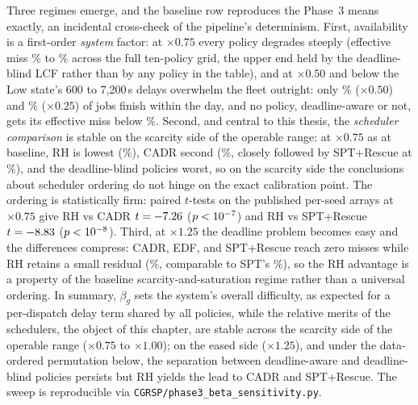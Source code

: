 {Three regimes emerge, and the baseline row reproduces the Phase~3 means exactly, an incidental cross-check of the pipeline's determinism. First, availability is a first-order \emph{system} factor: at $\times 0.75$ every policy degrades steeply (effective miss \BetaThreeQuarterMinEffMiss\% to \BetaThreeQuarterMaxEffMiss\% across the full ten-policy grid, the upper end held by the deadline-blind LCF rather than by any policy in the table), and at $\times 0.50$ and below the Low state's 600 to 7{,}200\,s delays overwhelm the fleet outright: only \BetaHalfCompletedPct\% ($\times 0.50$) and \BetaQuarterCompletedPct\% ($\times 0.25$) of jobs finish within the day, and no policy, deadline-aware or not, gets its effective miss below \BetaHalfMinEffMiss\%. Second, and central to this thesis, the \emph{scheduler comparison} is stable on the scarcity side of the operable range: at $\times 0.75$ as at baseline, RH is lowest (\BetaThreeQRHmiss\%), CADR second (\BetaThreeQCADRmiss\%, closely followed by SPT+Rescue at \BetaThreeQRescueMiss\%), and the deadline-blind policies worst, so on the scarcity side the conclusions about scheduler ordering do not hinge on the exact calibration point. The ordering is statistically firm: paired $t$-tests on the published per-seed arrays at $\times 0.75$ give RH vs CADR $t=-7.26$ ($p<10^{-7}$) and RH vs SPT+Rescue $t=-8.83$ ($p<10^{-8}$). Third, at $\times 1.25$ the deadline problem becomes easy and the differences compress: CADR, EDF, and SPT+Rescue reach zero misses while RH retains a small residual (\BetaUpRHmiss\%, comparable to SPT's \BetaUpSPTmiss\%), so the RH advantage is a property of the baseline scarcity-and-saturation regime rather than a universal ordering. In summary, $\beta_g$ sets the system's overall difficulty, as expected for a per-dispatch delay term shared by all policies, while the relative merits of the schedulers, the object of this chapter, are stable across the scarcity side of the operable range ($\times 0.75$ to $\times 1.00$); on the eased side ($\times 1.25$), and under the data-ordered permutation below, the separation between deadline-aware and deadline-blind policies persists but RH yields the lead to CADR and SPT+Rescue. The sweep is reproducible via \texttt{CGRSP/phase3\_beta\_sensitivity.py}.

}
